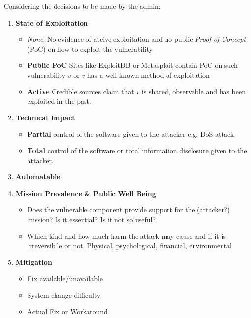 Considering the decisions to be made by the admin:
\begin{enumerate}
    \item \textbf{State of Exploitation}
    \begin{itemize}
        \item \textit{None}: No evidence of atcive exploitation and no public \textit{Proof of Concept} (PoC) on how to exploit the vulnerability
        \item \textbf{Public PoC} Sites like ExploitDB or Metasploit contain PoC on such vulnerability $v$ or $v$ has a well-known method of exploitation 
        \item \textbf{Active} Credible sources claim that $v$ is shared, observable and has been exploited in the past.
    \end{itemize}
    \item \textbf{Technical Impact}
    \begin{itemize}
        \item \textbf{Partial} control of the software given to the attacker e.g. DoS attack
        \item \textbf{Total} control of the software or total information disclosure given to the attacker.
    \end{itemize}
    \item \textbf{Automatable}
    \item \textbf{Mission Prevalence \& Public Well Being}
    \begin{itemize}
        \item Does the vulnerable component provide support for the (attacker?) mission? Is it essential? Is it not so useful?
        \item Which kind and how much harm the attack may cause and if it is irreversibile or not.
        Physical, psychological, financial, environmental 
    \end{itemize}
    \item \textbf{Mitigation}
    \begin{itemize}
        \item Fix available/unavailable
        \item System change difficulty
        \item Actual Fix or Workaround
    \end{itemize}
\end{enumerate}

